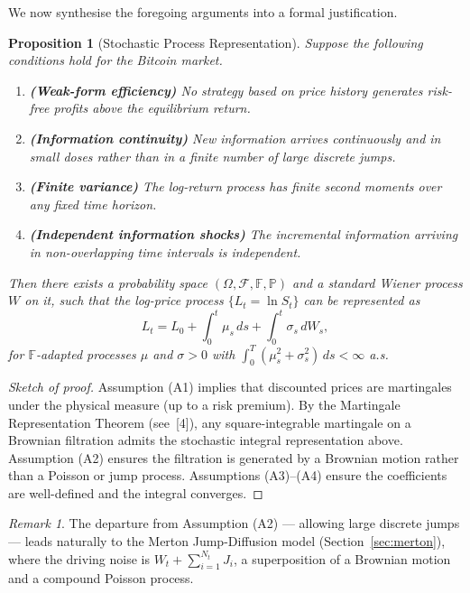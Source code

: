 \documentclass[12pt, a4paper, oneside]{report}
\theoremstyle{plain}
\newtheorem{proposition}[theorem]{Proposition}
\theoremstyle{definition}
\theoremstyle{remark}
\newtheorem{remark}[theorem]{Remark}
\newcommand{\Prob}{\mathbb{P}}
\newcommand{\F}{\mathcal{F}}
\begin{document}
We now synthesise the foregoing arguments into a formal justification.

\begin{proposition}[Stochastic Process Representation]
\label{prop:sp_rep}
Suppose the following conditions hold for the Bitcoin market.
\begin{enumerate}[leftmargin=1.25cm, label=\textup{(A\arabic*)}]
  \item \textbf{(Weak-form efficiency)}  No strategy based on price history
    generates risk-free profits above the equilibrium return.
  \item \textbf{(Information continuity)}  New information arrives continuously
    and in small doses rather than in a finite number of large discrete jumps.
  \item \textbf{(Finite variance)}  The log-return process has finite second moments
    over any fixed time horizon.
  \item \textbf{(Independent information shocks)}  The incremental information
    arriving in non-overlapping time intervals is independent.
\end{enumerate}
Then there exists a probability space $(\Omega, \F, \mathbb{F}, \Prob)$ and a
standard Wiener process $W$ on it, such that the log-price process
$\{L_t = \ln S_t\}$ can be represented as
\[
  L_t = L_0 + \int_0^t \mu_s\,ds + \int_0^t \sigma_s\,dW_s,
\]
for $\mathbb{F}$-adapted processes $\mu$ and $\sigma > 0$ with
$\int_0^T (\mu_s^2 + \sigma_s^2)\,ds < \infty$ a.s.
\end{proposition}

\begin{proof}[Sketch of proof]
Assumption (A1) implies that discounted prices are martingales under the physical
measure (up to a risk premium).  By the Martingale Representation Theorem (see~[4]),
any square-integrable martingale on a Brownian filtration admits the stochastic integral
representation above.  Assumption (A2) ensures the filtration is generated by a
Brownian motion rather than a Poisson or jump process.  Assumptions (A3)--(A4) ensure
the coefficients are well-defined and the integral converges.
\end{proof}

\begin{remark}
The departure from Assumption (A2) --- allowing large discrete jumps --- leads naturally
to the Merton Jump-Diffusion model (Section~\ref{sec:merton}), where the driving noise
is $W_t + \sum_{i=1}^{N_t} J_i$, a superposition of a Brownian motion and a
compound Poisson process.
\end{remark}
\end{document}
